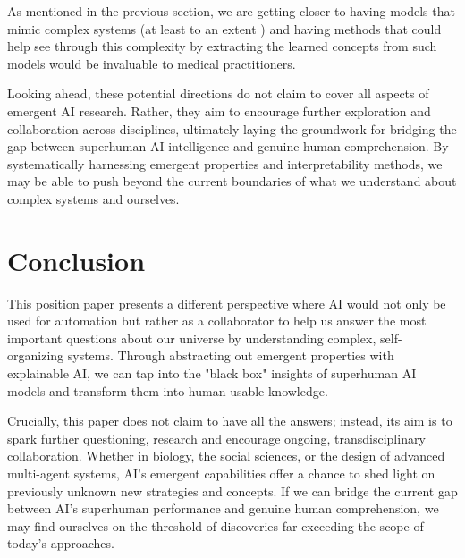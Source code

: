 \documentclass[11pt]{article}
\begin{document}
As mentioned in the previous section, we are getting closer to having models that mimic complex systems (at least to an extent \cite{alphafold}) and having methods that could help see through this complexity by extracting the learned concepts from such models would be invaluable to medical practitioners.

Looking ahead, these potential directions do not claim to cover all aspects of emergent AI research. Rather, they aim to encourage further exploration and collaboration across disciplines, ultimately laying the groundwork for bridging the gap between superhuman AI intelligence and genuine human comprehension. By systematically harnessing emergent properties and interpretability methods, we may be able to push beyond the current boundaries of what we understand about complex systems and ourselves.

\section{Conclusion}
This position paper presents a different perspective where AI would not only be used for automation but rather as a collaborator to help us answer the most important questions about our universe by understanding complex, self-organizing systems. Through abstracting out emergent properties with explainable AI, we can tap into the "black box" insights of superhuman AI models and transform them into human-usable knowledge.

Crucially, this paper does not claim to have all the answers; instead, its aim is to spark further questioning, research and encourage ongoing, transdisciplinary collaboration. Whether in biology, the social sciences, or the design of advanced multi-agent systems, AI's emergent capabilities offer a chance to shed light on previously unknown new strategies and concepts. If we can bridge the current gap between AI's superhuman performance and genuine human comprehension, we may find ourselves on the threshold of discoveries far exceeding the scope of today's approaches.
\end{document}
